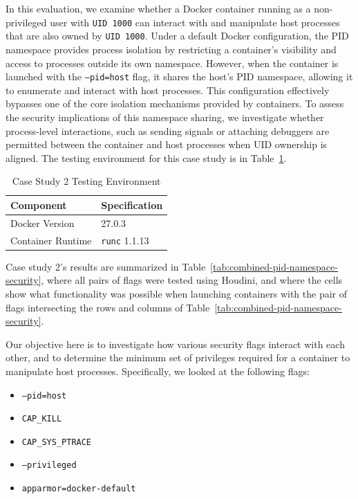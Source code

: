 \documentclass[12pt]{report}
\begin{document}
\begin{doublespace}
In this evaluation, we examine whether a Docker container running as a non-privileged user with \texttt{UID 1000} can interact with and manipulate host processes that are also owned by \texttt{UID 1000}. Under a default Docker configuration, the PID namespace provides process isolation by restricting a container's visibility and access to processes outside its own namespace. However, when the container is launched with the \texttt{--pid=host} flag, it shares the host’s PID namespace, allowing it to enumerate and interact with host processes. This configuration effectively bypasses one of the core isolation mechanisms provided by containers. To assess the security implications of this namespace sharing, we investigate whether process-level interactions, such as sending signals or attaching debuggers are permitted between the container and host processes when UID ownership is aligned. The testing environment for this case study is in Table~\ref{table:case2env}.

\begin{table}[h!]
\caption{Case Study 2 Testing Environment\label{table:case2env}}
\centering
\scriptsize \begin{tabular}{|l|l|} 
\hline
\textbf{Component} & \textbf{Specification} \\
\hline
Docker Version & 27.0.3 \\
\hline
Container Runtime & \texttt{runc} 1.1.13 \\
\hline
\end{tabular}
\end{table}

Case study 2's results are summarized in Table~\ref{tab:combined-pid-namespace-security}, where all pairs of flags were tested using Houdini, and where the cells show what functionality was possible when launching containers with the pair of flags intersecting the rows and columns of Table~\ref{tab:combined-pid-namespace-security}. 

Our objective here is to investigate how various security flags interact with each other, and to determine the minimum set of privileges required for a container to manipulate host processes. Specifically, we looked at the following flags:

\begin{itemize}
    \item \texttt{--pid=host}
    \item \texttt{CAP\_KILL}
    \item \texttt{CAP\_SYS\_PTRACE}
    \item \texttt{--privileged}
    \item \texttt{apparmor=docker-default}
\end{itemize}


\end{doublespace}
\end{document}
